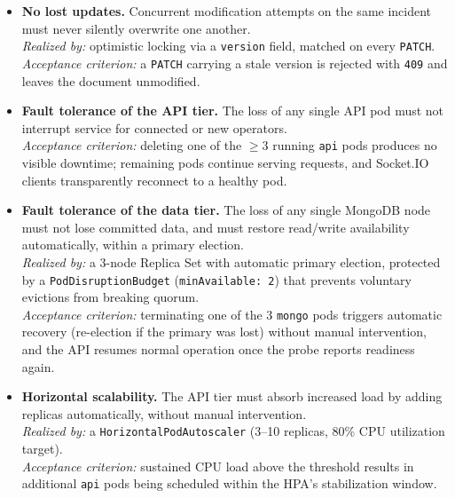 \documentclass{scrartcl}
\begin{document}
\begin{itemize}
  \item[\textbf{NFR1}] \textbf{No lost updates.} Concurrent modification attempts on the same incident must never silently overwrite one another. \\
  \emph{Realized by:} optimistic locking via a \texttt{version} field, matched on every \texttt{PATCH}. \\
  \emph{Acceptance criterion:} a \texttt{PATCH} carrying a stale version is rejected with \texttt{409} and leaves the document unmodified.

  \item[\textbf{NFR2}] \textbf{Fault tolerance of the API tier.} The loss of any single API pod must not interrupt service for connected or new operators. \\
  \emph{Acceptance criterion:} deleting one of the $\geq 3$ running \texttt{api} pods produces no visible downtime; remaining pods continue serving requests, and Socket.IO clients transparently reconnect to a healthy pod.

  \item[\textbf{NFR3}] \textbf{Fault tolerance of the data tier.} The loss of any single MongoDB node must not lose committed data, and must restore read/write availability automatically, within a primary election. \\
  \emph{Realized by:} a 3-node Replica Set with automatic primary election, protected by a \texttt{PodDisruptionBudget} (\texttt{minAvailable: 2}) that prevents voluntary evictions from breaking quorum. \\
  \emph{Acceptance criterion:} terminating one of the 3 \texttt{mongo} pods triggers automatic recovery (re-election if the primary was lost) without manual intervention, and the API resumes normal operation once the probe reports readiness again.

  \item[\textbf{NFR4}] \textbf{Horizontal scalability.} The API tier must absorb increased load by adding replicas automatically, without manual intervention. \\
  \emph{Realized by:} a \texttt{HorizontalPodAutoscaler} (3--10 replicas, 80\% CPU utilization target). \\
  \emph{Acceptance criterion:} sustained CPU load above the threshold results in additional \texttt{api} pods being scheduled within the HPA's stabilization window.


\end{itemize}
\end{document}
